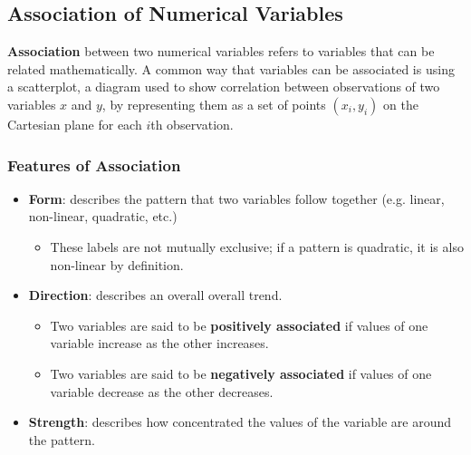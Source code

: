 \documentclass[10pt]{article}
\begin{document}
\subsection{Association of Numerical Variables}
\textbf{Association} between two numerical variables refers to variables that can be related mathematically. A common way that variables can be associated is using a scatterplot, a diagram used to show correlation between observations of two variables $x$ and $y$, by representing them as a set of points $(x_i, y_i)$ on the Cartesian plane for each $i$th observation.
\subsubsection{Features of Association}
\begin{itemize}
    \item \textbf{Form}: describes the pattern that two variables follow together (e.g. linear, non-linear, quadratic, etc.)
    \begin{itemize}
        \item These labels are not mutually exclusive; if a pattern is quadratic, it is also non-linear by definition.
    \end{itemize}
    \item \textbf{Direction}: describes an overall overall trend.
    \begin{itemize}
        \item Two variables are said to be \textbf{positively associated} if values of one variable increase as the other increases.
        \item Two variables are said to be \textbf{negatively associated} if values of one variable decrease as the other decreases.
    \end{itemize}
    \item \textbf{Strength}: describes how concentrated the values of the variable are around the pattern.
\end{itemize}
\end{document}
